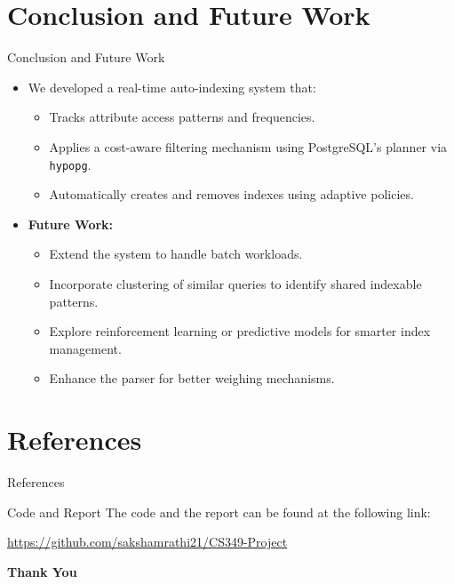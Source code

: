 \documentclass[Serif, 10pt, brown]{beamer}
\theoremstyle{example}
\theoremstyle{plain}
\begin{document}
\section{Conclusion and Future Work}
\begin{frame}{Conclusion and Future Work}
	\begin{itemize}
		\item We developed a real-time auto-indexing system that:
		\begin{itemize}
			\item Tracks attribute access patterns and frequencies.
			\item Applies a cost-aware filtering mechanism using PostgreSQL’s planner via \texttt{hypopg}.
			\item Automatically creates and removes indexes using adaptive policies.
		\end{itemize}
	
		\vspace{0.3cm}
		\item \textbf{Future Work:}
		\begin{itemize}
			\item Extend the system to handle batch workloads.
			\item Incorporate clustering of similar queries to identify shared indexable patterns.
			\item Explore reinforcement learning or predictive models for smarter index management.
			\item Enhance the parser for better weighing mechanisms.
		\end{itemize}
	\end{itemize}
	\end{frame}

\section{References}
\begin{frame}{References}
	
    
\end{frame}

\begin{frame}{Code and Report}
    The code and the report can be found at the following link:
    \begin{center}
        \url{https://github.com/sakshamrathi21/CS349-Project}
    \end{center}
\end{frame}

\begin{frame}
    \Huge{\centerline{\bf Thank You}}
\end{frame}
\end{document}
